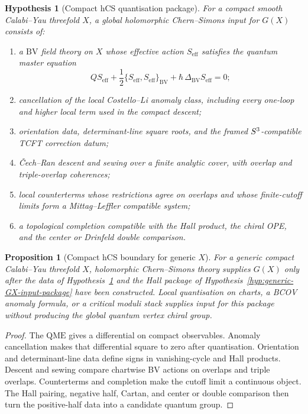 \documentclass[11pt]{amsart}
\newtheorem{proposition}[theorem]{Proposition}
\newtheorem{hypothesis}[theorem]{Hypothesis}
\theoremstyle{definition}
\providecommand{\QME}{\mathrm{QME}}
\providecommand{\BV}{\mathrm{BV}}
\begin{document}
\begin{hypothesis}[Compact hCS quantisation package]
\label{hyp:compact-hcs-package}
For a compact smooth Calabi--Yau threefold \(X\), a global holomorphic
Chern--Simons input for \(G(X)\) consists of:
\begin{enumerate}
\item a \(\BV\) field theory on \(X\) whose effective action
  \(S_{\mathrm{eff}}\) satisfies the quantum master equation
  \[
    Q S_{\mathrm{eff}}
    + \frac12\{S_{\mathrm{eff}},S_{\mathrm{eff}}\}_{\BV}
    + \hbar\,\Delta_{\BV}S_{\mathrm{eff}}=0;
  \]
\item cancellation of the local Costello--Li anomaly class, including
  every one-loop and higher local term used in the compact descent;
\item orientation data, determinant-line square roots, and the framed
  \(S^3\)-compatible TCFT correction datum;
\item \v{C}ech--Ran descent and sewing over a finite analytic cover,
  with overlap and triple-overlap coherences;
\item local counterterms whose restrictions agree on overlaps and whose
  finite-cutoff limits form a Mittag--Leffler compatible system;
\item a topological completion compatible with the Hall product, the
  chiral OPE, and the center or Drinfeld double comparison.
\end{enumerate}
\end{hypothesis}

\begin{proposition}[Compact hCS boundary for generic \(X\)]
\label{prop:compact-hcs-boundary-generic}
For a generic compact Calabi--Yau threefold \(X\), holomorphic
Chern--Simons theory supplies \(G(X)\) only after the data of
Hypothesis~\ref{hyp:compact-hcs-package} and the Hall package of
Hypothesis~\ref{hyp:generic-GX-input-package} have been constructed.
Local quantisation on charts, a BCOV anomaly formula, or a critical
moduli stack supplies input for this package without producing the
global quantum vertex chiral group.
\end{proposition}

\begin{proof}
The \(\QME\) gives a differential on compact observables.  Anomaly
cancellation makes that differential square to zero after quantisation.
Orientation and determinant-line data define signs in vanishing-cycle
and Hall products.  Descent and sewing compare chartwise BV actions on
overlaps and triple overlaps.  Counterterms and completion make the
cutoff limit a continuous object.  The Hall pairing, negative half,
Cartan, and center or double comparison then turn the positive-half data
into a candidate quantum group.
\end{proof}
\end{document}
